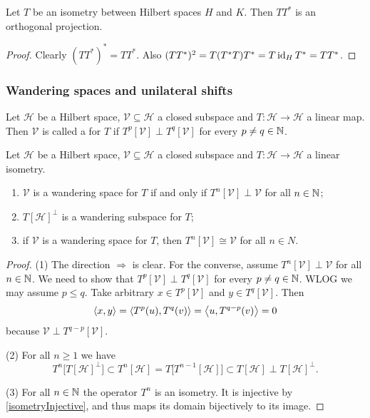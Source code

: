 \begin{lemma} \label{isometryRangeProjection}
Let $T$ be an isometry between Hilbert spaces $H$ and $K$. Then $TT^*$ is an orthogonal projection.
\end{lemma}
\begin{proof}
Clearly $(TT^*)^* = TT^*$. Also $(TT^*)^2 = T(T^*T)T^* = T\operatorname{id}_HT^* = TT^*$.
\end{proof}


\subsubsection{Wandering spaces and unilateral shifts}
\begin{definition}
Let $\mathcal{H}$ be a Hilbert space, $\mathcal{V}\subseteq \mathcal{H}$ a closed subspace and $T:\mathcal{H}\to \mathcal{H}$ a linear map. Then $\mathcal{V}$ is called a  for $T$ if $T^p[\mathcal{V}]\perp T^q[\mathcal{V}]$ for every $p\neq q\in\mathbb{N}$.
\end{definition}

\begin{lemma} \label{WoldLemma1}
Let $\mathcal{H}$ be a Hilbert space, $\mathcal{V}\subseteq \mathcal{H}$ a closed subspace and $T:\mathcal{H}\to \mathcal{H}$ a linear isometry.
\begin{enumerate}
\item $\mathcal{V}$ is a wandering space for $T$ \textup{if and only if} $T^n[\mathcal{V}]\perp \mathcal{V}$ for all $n\in\mathbb{N}$;
\item $T[\mathcal{H}]^\perp$ is a wandering subspace for $T$;
\item if $\mathcal{V}$ is a wandering space for $T$, then $T^n[\mathcal{V}] \cong \mathcal{V}$ for all $n\in N$.
\end{enumerate}
\end{lemma}
\begin{proof}
(1) The direction $\Rightarrow$ is clear. For the converse, assume $T^n[\mathcal{V}]\perp \mathcal{V}$ for all $n\in\mathbb{N}$. We need to show that $T^p[\mathcal{V}]\perp T^q[\mathcal{V}]$ for every $p\neq q\in\mathbb{N}$. WLOG we may assume $p\leq q$. Take arbitrary $x\in T^p[\mathcal{V}]$ and $y\in T^q[\mathcal{V}]$. Then
\[ \left\langle x,y \right\rangle = \left\langle T^p(u), T^q(v) \right\rangle = \left\langle u, T^{q-p}(v) \right\rangle = 0 \]
because $\mathcal{V} \perp T^{q-p}[\mathcal{V}]$.

(2) For all $n\geq 1$ we have
\[ T^{n}\big[T[\mathcal{H}]^\perp\big] \subset T^{n}[\mathcal{H}] = T\big[T^{n-1}[\mathcal{H}]\big] \subset T[\mathcal{H}] \perp T[\mathcal{H}]^\perp. \]

(3) For all $n\in \mathbb{N}$ the operator $T^n$ is an isometry. It is injective by \ref{isometryInjective}, and thus maps its domain bijectively to its image.
\end{proof}

